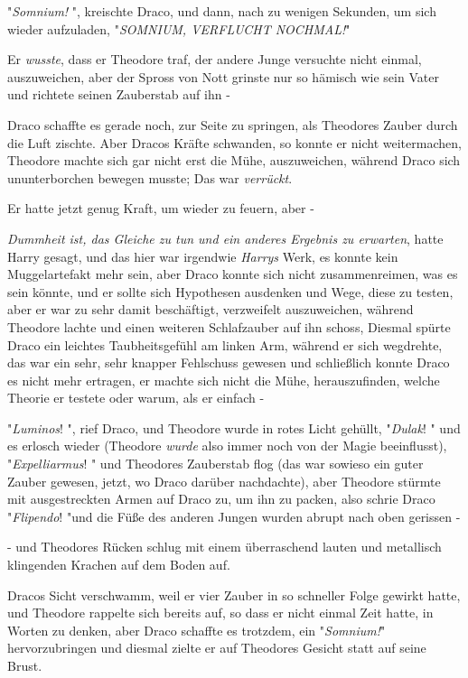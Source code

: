{"\emph{Somnium!} ", kreischte Draco, und dann, nach zu wenigen Sekunden, um sich wieder aufzuladen, "\emph{SOMNIUM, VERFLUCHT NOCHMAL!}"

Er \emph{wusste}, dass er Theodore traf, der andere Junge versuchte nicht einmal, auszuweichen, aber der Spross von Nott grinste nur so hämisch wie sein Vater und richtete seinen Zauberstab auf ihn -

Draco schaffte es gerade noch, zur Seite zu springen, als Theodores Zauber durch die Luft zischte. Aber Dracos Kräfte schwanden, so konnte er nicht weitermachen, Theodore machte sich gar nicht erst die Mühe, auszuweichen, während Draco sich ununterborchen bewegen musste; Das war \emph{verrückt}.

Er hatte jetzt genug Kraft, um wieder zu feuern, aber -

\emph{Dummheit ist, das Gleiche zu tun und ein anderes Ergebnis zu erwarten}, hatte Harry gesagt, und das hier war irgendwie \emph{Harrys} Werk, es konnte kein Muggelartefakt mehr sein, aber Draco konnte sich nicht zusammenreimen, was es sein könnte, und er sollte sich Hypothesen ausdenken und Wege, diese zu testen, aber er war zu sehr damit beschäftigt, verzweifelt auszuweichen, während Theodore lachte und einen weiteren Schlafzauber auf ihn schoss, Diesmal spürte Draco ein leichtes Taubheitsgefühl am linken Arm, während er sich wegdrehte, das war ein sehr, sehr knapper Fehlschuss gewesen und schließlich konnte Draco es nicht mehr ertragen, er machte sich nicht die Mühe, herauszufinden, welche Theorie er testete oder warum, als er einfach -

"\emph{Luminos}! ", rief Draco, und Theodore wurde in rotes Licht gehüllt, "\emph{Dulak}! " und es erlosch wieder (Theodore \emph{wurde} also immer noch von der Magie beeinflusst), "\emph{Expelliarmus}! " und Theodores Zauberstab flog (das war sowieso ein guter Zauber gewesen, jetzt, wo Draco darüber nachdachte), aber Theodore stürmte mit ausgestreckten Armen auf Draco zu, um ihn zu packen, also schrie Draco "\emph{Flipendo}! "und die Füße des anderen Jungen wurden abrupt nach oben gerissen -

- und Theodores Rücken schlug mit einem überraschend lauten und metallisch klingenden Krachen auf dem Boden auf.

Dracos Sicht verschwamm, weil er vier Zauber in so schneller Folge gewirkt hatte, und Theodore rappelte sich bereits auf, so dass er nicht einmal Zeit hatte, in Worten zu denken, aber Draco schaffte es trotzdem, ein "\emph{Somnium!}" hervorzubringen und diesmal zielte er auf Theodores Gesicht statt auf seine Brust.

}
